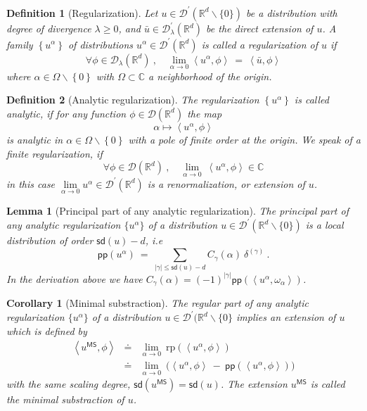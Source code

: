 \documentclass[10pt]{book}
\newcommand{\pp}{\mathsf{pp}}
\newcommand{\sd}{\mathsf{sd}}
\newcommand{\abs}[1]{\left|#1\right|}
\newcommand{\sm}[1]{\left\langle#1\right\rangle}
\newcommand{\Dcal}{\mathcal{D}}
\newcommand{\Rbb}{\mathbb{R}}
\theoremstyle{break}
\newtheorem{lemma}{Lemma}
\newtheorem{corollary}{Corollary}
\newtheorem{definition}{Definition}
\begin{document}
\begin{definition}[Regularization]
 Let $u \in \Dcal^\prime(\Rbb^d \backslash \{ 0\})$ be a distribution with degree of divergence $\lambda\geq0$, and $\bar{u} \in \mathcal{D}^\prime_{\lambda}(\Rbb^d)$ be the direct extension of $u$. A family $\left\{ u^{\alpha}\right\}$ of distributions $u^{\alpha}\in\Dcal^\prime(\Rbb^d)$ is called a regularization of $u$ if
 \begin{equation*}
  \forall \phi \in \Dcal_{\lambda}(\Rbb^d) \ , \quad \lim_{\alpha \to 0} \sm{u^{\alpha},\phi} \ = \ \sm{\bar{u},\phi}  
 \end{equation*}
 where $\alpha \in \Omega\backslash\left\{ 0\right\}$ with $\Omega\subset\mathbb{C}$ a neighborhood of the origin. 
\end{definition}

\begin{definition}[Analytic regularization]
 The regularization $\left\{ u^{\alpha}\right\} $ is called analytic, if for any function $\phi \in \Dcal(\Rbb^d)$ the map 
 \begin{equation*}
  \alpha \mapsto \sm{u^{\alpha},\phi}
 \end{equation*}
 is analytic in $\alpha\in\Omega\backslash\left\{ 0\right\}$ with a pole of finite order at the origin. We speak of a finite regularization, if
 \begin{equation*}
  \forall \phi \in \Dcal(\Rbb^d)\ , \quad \lim_{\alpha\to0} \ \sm{u^{\alpha} , \phi } \in \mathbb{C}  
 \end{equation*}
 in this case $\underset{\alpha \to 0}{\lim} u^{\alpha} \in \Dcal^\prime(\Rbb^d)$ is a renormalization, or extension of $u$. 
\end{definition}

\begin{lemma}[Principal part of any analytic regularization]
 The principal part of any analytic regularization $\{u^\alpha\}$ of a distribution $u \in \Dcal^\prime(\Rbb^d \backslash \{0\} )$ is a local distribution of order $\sd(u)-d$, i.e
 \begin{equation*}
  \pp\left( u^\alpha \right) \ = \ \sum_{\abs{\gamma} \leq \sd(u)-d} C_\gamma(\alpha) \ \delta^{(\gamma)} \ . 
 \end{equation*}
 In the derivation above we have $C_\gamma(\alpha) = (-1)^{\abs{\gamma}} \pp\left(\sm{u^\alpha , \omega_\alpha}\right)$. 
\end{lemma}

\begin{corollary}[Minimal substraction]
 The regular part of any analytic regularization $\{u^\alpha\}$ of a distribution $u \in \Dcal^\prime(\Rbb^d \backslash \{0\}$ implies an extension of $u$ which is defined by 
 \begin{eqnarray*}
  \sm{u^{\mathsf{MS}},\phi} &\doteq& \lim_{\alpha \to 0} \ \text{rp}\left(\sm{u^\alpha , \phi}\right) \\
  &\doteq& \lim_{\alpha \to 0} \ \bigg( \sm{u^\alpha , \phi} \ - \ \pp\left(\sm{u^\alpha , \phi}\right) \bigg)
 \end{eqnarray*}
 with the same scaling degree, $\sd(u^{\mathsf{MS}}) = \sd(u)$. The extension $u^{\mathsf{MS}}$ is called the minimal substraction of $u$. 
\end{corollary}
\end{document}
